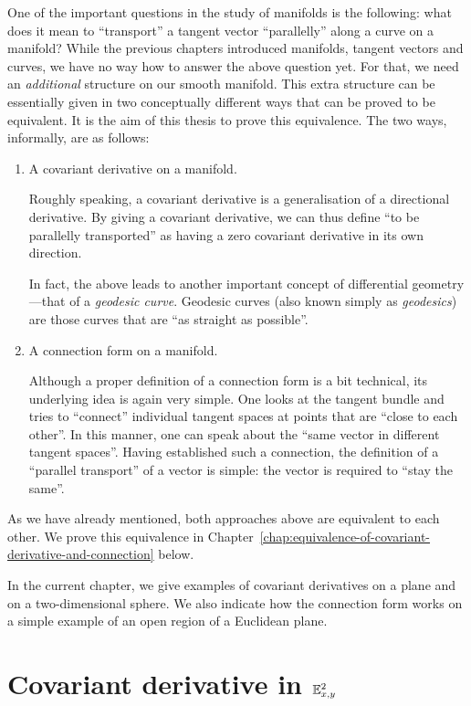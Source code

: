 \documentclass[11pt,a4paper,twoside,openany]{report}
\theoremstyle{my-theorem}
\theoremstyle{non-theorem}
\begin{document}
		One of the important questions in the study of manifolds is the following: what does it mean to ``transport'' a tangent vector ``parallelly'' along a curve on a manifold? While the previous chapters introduced manifolds, tangent vectors and curves, we have no way how to answer the above question yet. For that, we need an \emph{additional} structure on our smooth manifold. This extra structure can be essentially given in two conceptually different ways that can be proved to be equivalent. It is the aim of this thesis to prove this equivalence. The two ways, informally, are as follows:
		\begin{enumerate}[label=\rm(\alph*)]
			\item A covariant derivative on a manifold.
			
			Roughly speaking, a covariant derivative is a generalisation of a directional derivative. By giving a covariant derivative, we can thus define ``to be parallelly transported'' as having a zero covariant derivative in its own direction.
			
			In fact, the above leads to another important concept of differential geometry---that of a \emph{geodesic curve}. Geodesic curves (also known simply as \emph{geodesics}) are those curves that are ``as straight as possible''.
			
			\item A connection form on a manifold.
			
			Although a proper definition of a connection form is a bit technical, its underlying idea is again very simple. One looks at the tangent bundle and tries to ``connect'' individual tangent spaces at points that are ``close to each other''. In this manner, one can speak about the ``same vector in different tangent spaces''. Having established such a connection, the definition of a ``parallel transport'' of a vector is simple: the vector is required to ``stay the same''.
		\end{enumerate}
		As we have already mentioned, both approaches above are equivalent to each other. We prove this equivalence in Chapter~\ref{chap:equivalence-of-covariant-derivative-and-connection} below.
		
		In the current chapter, we give examples of covariant derivatives on a plane and on a two-dimensional sphere. We also indicate how the connection form works on a simple example of an open region of a Euclidean plane.
		
		\section{Covariant derivative in ${\mathbb E}^2_{x,y}$}
		
\end{document}
